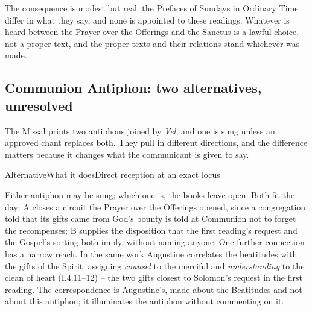 The consequence is modest but real: the Prefaces of Sundays in Ordinary Time differ in what they say, and none is appointed to these readings. Whatever is heard between the Prayer over the Offerings and the Sanctus is a lawful choice, not a proper text, and the proper texts and their relations stand whichever was made.

\subsection*{Communion Antiphon: two alternatives, unresolved}

The Missal prints two antiphons joined by \emph{Vel}, and one is sung unless an approved chant replaces both. They pull in different directions, and the difference matters because it changes what the communicant is given to say.

\begin{threecoltable}{Alternative}{What it does}{Direct reception at an exact locus}
\end{threecoltable}

Either antiphon may be sung; which one is, the books leave open. Both fit the day: A closes a circuit the Prayer over the Offerings opened, since a congregation told that its gifts came from God's bounty is told at Communion not to forget the recompenses; B supplies the disposition that the first reading's request and the Gospel's sorting both imply, without naming anyone. One further connection has a narrow reach. In the same work Augustine correlates the beatitudes with the gifts of the Spirit, assigning \emph{counsel} to the merciful and \emph{understanding} to the clean of heart (I.4.11--12) -- the two gifts closest to Solomon's request in the first reading. The correspondence is Augustine's, made about the Beatitudes and not about this antiphon; it illuminates the antiphon without commenting on it.

